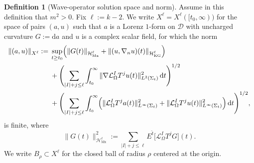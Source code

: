 \documentclass[11pt]{article}
\numberwithin{equation}{section}
\theoremstyle{plain}
\theoremstyle{definition}
\newtheorem{definition}{Definition}[section]
\theoremstyle{remark}
\newcommand{\D}{\mathcal{D}}
\newcommand{\dd}{\mathrm{d}}
\begin{document}
\begin{definition}[Wave-operator solution space and norm]\label{def:waveop-space}
Assume in this definition that $m^{2}>0$.  Fix $\ell:=k-2$.
We write $X^{\ell}=X^{\ell}([t_0,\infty))$ for the space of pairs $(a,u)$ such that
$a$ is a Lorenz $1$-form on $\D$ with uncharged curvature $G:=\dd a$ and $u$ is a complex scalar field, for which the norm
\begin{eqnarray}\label{eq:X-norm}
\|(a,u)\|_{X^{\ell}}
:=\;&
\sup_{t\ge t_{0}}\Bigl(
\|G(t)\|_{\mathcal H_{\mathrm{Mx}}^{\ell}}
+
\|(u,\nabla_n u)(t)\|_{\mathcal H_{\mathrm{KG}}^{\ell}}
\Bigr)
\\
&+\Biggl(\sum_{|I|+j\le \ell}\int_{t_{0}}^{\infty}
\|\nabla \mathcal L_{\Omega}^{I}T^{j}u(t)\|_{L^{2}(\Sigma_t)}^{2}\,\dd t\Biggr)^{1/2}
\\
&+\Biggl(\sum_{|I|+j\le \ell}\int_{t_{0}}^{\infty}
\Bigl(
\|\mathcal L_{\Omega}^{I}T^{j}a(t)\|_{L^{\infty}(\Sigma_t)}^{2}
+
\|\mathcal L_{\Omega}^{I}T^{j}u(t)\|_{L^{\infty}(\Sigma_t)}^{2}
\Bigr)\,\dd t\Biggr)^{1/2},
\end{eqnarray}
is finite, where
\begin{equation}
\|G(t)\|_{\mathcal H_{\mathrm{Mx}}^{\ell}}^{2}
:=
\sum_{|I|+j\le \ell}E^{\hat t}\!\big[\mathcal L_{\Omega}^{I}T^{j}G\big](t).
\end{equation}
We write $B_{\rho}\subset X^{\ell}$ for the closed ball of radius $\rho$ centered at the origin.
\end{definition}
\end{document}
